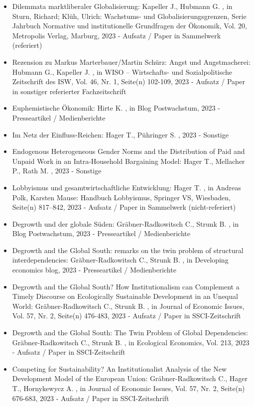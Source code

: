 \begin{itemize}
	 \item Dilemmata marktliberaler Globalisierung: Kapeller J., Hubmann G. , in Sturn, Richard; Klüh, Ulrich: Wachstums- und Globalisierungsgrenzen, Serie Jahrbuch Normative und institutionelle Grundfragen der Ökonomik, Vol. 20, Metropolis Verlag, Marburg, 2023 - Aufsatz / Paper in Sammelwerk (referiert)
	 \item Rezension zu Markus Marterbauer/Martin Schürz: Angst und Angstmacherei: Hubmann G., Kapeller J. , in WISO – Wirtschafts- und Sozialpolitische Zeitschrift des ISW, Vol. 46, Nr. 1, Seite(n) 102-109, 2023 - Aufsatz / Paper in sonstiger referierter Fachzeitschrift
	 \item Euphemistische Ökonomik: Hirte K. , in Blog Postwachstum, 2023 - Presseartikel / Medienberichte
	 \item Im Netz der Einfluss-Reichen: Hager T., Pühringer S. , 2023 - Sonstige
	 \item Endogenous Heterogeneous Gender Norms and the Distribution of Paid and Unpaid Work in an Intra-Household Bargaining Model: Hager T., Mellacher P., Rath M. , 2023 - Sonstige
	 \item Lobbyismus und gesamtwirtschaftliche Entwicklung: Hager T. , in Andreas Polk, Karsten Mause: Handbuch Lobbyismus, Springer VS, Wiesbaden, Seite(n) 817–842, 2023 - Aufsatz / Paper in Sammelwerk (nicht-referiert)
	 \item Degrowth und der globale Süden: Gräbner-Radkowitsch C., Strunk B. , in Blog Postwachstum, 2023 - Presseartikel / Medienberichte
	 \item Degrowth and the Global South: remarks on the twin problem of structural interdependencies: Gräbner-Radkowitsch C., Strunk B. , in Developing economics blog, 2023 - Presseartikel / Medienberichte
	 \item Degrowth and the Global South? How Institutionalism can Complement a Timely Discourse on Ecologically Sustainable Development in an Unequal World: Gräbner-Radkowitsch C., Strunk B. , in Journal of Economic Issues, Vol. 57, Nr. 2, Seite(n) 476-483, 2023 - Aufsatz / Paper in SSCI-Zeitschrift
	 \item Degrowth and the Global South: The Twin Problem of Global Dependencies: Gräbner-Radkowitsch C., Strunk B. , in Ecological Economics, Vol. 213, 2023 - Aufsatz / Paper in SSCI-Zeitschrift
	 \item Competing for Sustainability? An Institutionalist Analysis of the New Development Model of the European Union: Gräbner-Radkowitsch C., Hager T., Hornykewycz A. , in Journal of Economic Issues, Vol. 57, Nr. 2, Seite(n) 676-683, 2023 - Aufsatz / Paper in SSCI-Zeitschrift

\end{itemize}
